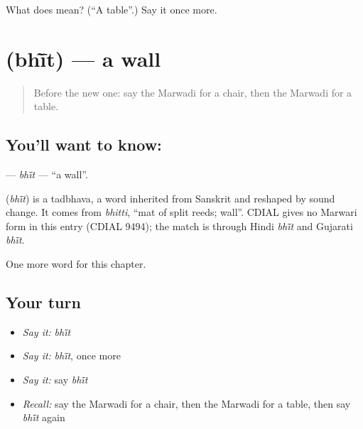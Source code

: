 \begin{tcolorbox}[breakable,colback=teal!4,colframe=teal!35!black,title={Before you move on}]
What does  mean? (\textquotedblleft{}A table\textquotedblright{}.) Say it once more.
\end{tcolorbox}
\section[\texorpdfstring{\mw{भींत} (bhī̃t)}{भींत (bhī̃t)}]{ (bhī̃t) — a wall}

\label{lesson:MW-C62-bhit}



\begin{quote}
Before the new one: say the Marwadi for a chair, then the Marwadi for a table.
\end{quote}

\subsection*{You'll want to know: }
\textbf{} — \emph{bhī̃t} — \textquotedblleft{}a wall\textquotedblright{}.

\begin{cousinweb}
\textbf{} (\emph{bhī̃t}) is a tadbhava, a word inherited from Sanskrit and reshaped by sound change. It comes from \emph{bhitti}, \textquotedblleft{}mat of split reeds; wall\textquotedblright{}. CDIAL gives no Marwari form in this entry (CDIAL 9494); the match is through Hindi \emph{bhī̃t} and Gujarati \emph{bhī̃t}.
\end{cousinweb}

\begin{grammarlens}[title={What you've built}]
One more word for this chapter.
\end{grammarlens}

\subsection*{Your turn}
\begin{itemize}
\raggedright
  \item \emph{Say it:} \emph{bhī̃t}
  \item \emph{Say it:} \emph{bhī̃t}, once more
  \item \emph{Say it:} say \emph{bhī̃t}
  \item \emph{Recall:} say the Marwadi for a chair, then the Marwadi for a table, then say \emph{bhī̃t} again
\end{itemize}

